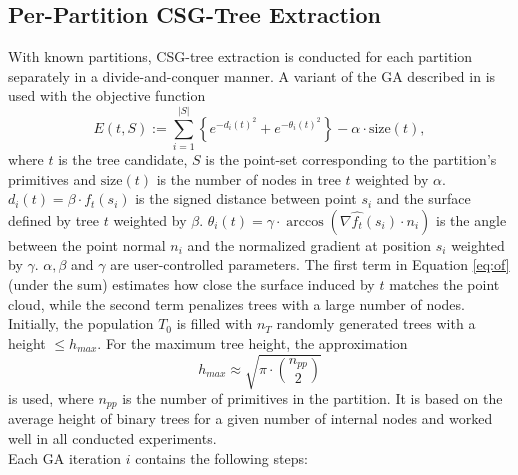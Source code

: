 \subsection{Per-Partition \ac{CSG}-Tree Extraction}
\label{ch:ga}
With known partitions, \ac{CSG}-tree extraction is conducted for each partition separately in a divide-and-conquer manner.
A variant of the \ac{GA} described in \cite{fayolle2016evolutionary} is used with the objective function
\begin{equation}
\label{eq:of}
E(t, S) := \sum_{i=1}^{|S|}\left\{e^{-d_i(t)^2}+e^{-\theta_i(t)^2}\right\}-\alpha \cdot \text{size}(t),
\end{equation}
where $t$ is the tree candidate, $S$ is the point-set corresponding to the partition's primitives and $\text{size}(t)$ is the number of nodes in tree $t$ weighted by $\alpha$.
$d_i(t) = \beta \cdot f_t(s_i)$ is the signed distance between point $s_i$ and the surface defined by tree $t$ weighted by $\beta$.
$\theta_i(t) = \gamma \cdot  \arccos(\nabla \hat{f_t}(s_i) \cdot n_i)$ is the angle between the point normal $n_i$ and the normalized gradient at position $s_i$ weighted by $\gamma$.  
$\alpha, \beta$ and $\gamma$ are user-controlled parameters. 
The first term in Equation \ref{eq:of} (under the sum) estimates how close the surface induced by $t$ matches the point cloud, while the second term penalizes trees with a large number of nodes.
\\
Initially, the population $T_0$ is filled with $n_T$ randomly generated trees with a height $\le h_{max}$. 
For the maximum tree height, the approximation  
\begin{equation}
\label{eq:hmax}
h_{max}\approx \sqrt{\pi \cdot \binom{n_{pp}}{2}}
\end{equation}
is used, where $n_{pp}$ is the number of primitives in the partition.
It is based on the average height of binary trees for a given number of internal nodes \cite{flajolet1982TheAH} and worked well in all conducted experiments. 
\\
Each \ac{GA} iteration $i$ contains the following steps:

